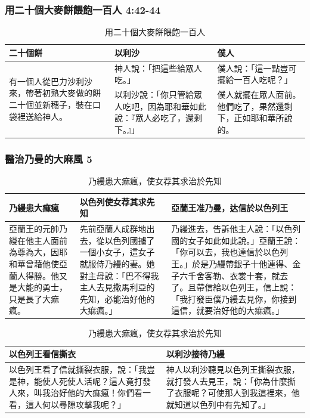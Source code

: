 \subsubsection{用二十個大麥餅餵飽一百人 4:42-44}
\begin{table}[H]
\centering
\begin{tabular}{p{4.5cm}|p{6.25cm}|p{}}\hline\hline
二十個餅&以利沙&僕人\\\hline
\multirow{2}{4.6cm}{有一個人從巴力沙利沙來，帶著初熟大麥做的餅二十個並新穗子，裝在口袋裡送給神人。}&神人說：「把這些給眾人吃。」&僕人說：「這一點豈可擺給一百人吃呢？」\\\cline{2-3}
&以利沙說：「你只管給眾人吃吧，因為耶和華如此說：『眾人必吃了，還剩下。』」&僕人就擺在眾人面前。他們吃了，果然還剩下，正如耶和華所說的。\\\hline
\end{tabular}
\caption{用二十個大麥餅餵飽一百人}
\end{table}


\subsubsection{醫治乃曼的大麻風 5}
\begin{table}[H]
\centering
\begin{tabular}{p{3.75cm}|p{}|p{8.25cm}}\hline\hline
乃縵患大痲瘋&以色列使女荐其求先知&亞蘭王准乃曼，达信於以色列王\\\hline
亞蘭王的元帥乃縵在他主人面前為尊為大，因耶和華曾藉他使亞蘭人得勝。他又是大能的勇士，只是長了大痲瘋。
&先前亞蘭人成群地出去，從以色列國擄了一個小女子，這女子就服侍乃縵的妻。她對主母說：「巴不得我主人去見撒馬利亞的先知，必能治好他的大痲瘋。」 
&乃縵進去，告訴他主人說：「以色列國的女子如此如此說。」亞蘭王說：「你可以去，我也達信於以色列王。」於是乃縵帶銀子十他連得、金子六千舍客勒、衣裳十套，就去了。且帶信給以色列王，信上說：「我打發臣僕乃縵去見你，你接到這信，就要治好他的大痲瘋。」\\\hline
\end{tabular}
\caption{乃縵患大痲瘋，使女荐其求治於先知}
\end{table}


\begin{table}[H]
\centering
\begin{tabular}{p{8.25cm}|p{}}\hline\hline
以色列王看信撕衣&以利沙接待乃縵\\\hline
以色列王看了信就撕裂衣服，說：「我豈是神，能使人死使人活呢？這人竟打發人來，叫我治好他的大痲瘋！你們看一看，這人何以尋隙攻擊我呢？」
&神人以利沙聽見以色列王撕裂衣服，就打發人去見王，說：「你為什麼撕了衣服呢？可使那人到我這裡來，他就知道以色列中有先知了。」\\\hline
\end{tabular}
\caption{乃縵患大痲瘋，使女荐其求治於先知}
\end{table}


